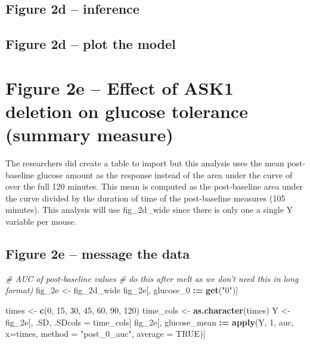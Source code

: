 \documentclass[]{book}
\newenvironment{Shaded}{\begin{snugshade}}{\end{snugshade}}
\newcommand{\CommentTok}[1]{\textcolor[rgb]{0.56,0.35,0.01}{\textit{#1}}}
\newcommand{\DataTypeTok}[1]{\textcolor[rgb]{0.13,0.29,0.53}{#1}}
\newcommand{\DecValTok}[1]{\textcolor[rgb]{0.00,0.00,0.81}{#1}}
\newcommand{\ErrorTok}[1]{\textcolor[rgb]{0.64,0.00,0.00}{\textbf{#1}}}
\newcommand{\KeywordTok}[1]{\textcolor[rgb]{0.13,0.29,0.53}{\textbf{#1}}}
\newcommand{\NormalTok}[1]{#1}
\newcommand{\OperatorTok}[1]{\textcolor[rgb]{0.81,0.36,0.00}{\textbf{#1}}}
\newcommand{\OtherTok}[1]{\textcolor[rgb]{0.56,0.35,0.01}{#1}}
\newcommand{\StringTok}[1]{\textcolor[rgb]{0.31,0.60,0.02}{#1}}
\begin{document}
\hypertarget{figure-2d-inference}{%
\subsection{Figure 2d -- inference}\label{figure-2d-inference}}

\hypertarget{figure-2d-plot-the-model}{%
\subsection{Figure 2d -- plot the model}\label{figure-2d-plot-the-model}}

\hypertarget{figure-2e-effect-of-ask1-deletion-on-glucose-tolerance-summary-measure}{%
\section{Figure 2e -- Effect of ASK1 deletion on glucose tolerance (summary measure)}\label{figure-2e-effect-of-ask1-deletion-on-glucose-tolerance-summary-measure}}

The researchers did create a table to import but this analysis uses the mean post-baseline glucose amount as the response instead of the area under the curve of over the full 120 minutes. This mean is computed as the post-baseline area under the curve divided by the duration of time of the post-baseline measures (105 minutes). This analysis will use fig\_2d\_wide since there is only one a single Y variable per mouse.

\hypertarget{figure-2e-message-the-data}{%
\subsection{Figure 2e -- message the data}\label{figure-2e-message-the-data}}

\begin{Shaded}
\begin{Highlighting}[]
\CommentTok{# AUC of post-baseline values}
\CommentTok{# do this after melt as we don't need this in long format)}
\NormalTok{fig_2e <-}\StringTok{ }\NormalTok{fig_2d_wide}
\NormalTok{fig_2e[, glucose_}\DecValTok{0} \OperatorTok{:}\ErrorTok{=}\StringTok{ }\KeywordTok{get}\NormalTok{(}\StringTok{"0"}\NormalTok{)]}

\NormalTok{times <-}\StringTok{ }\KeywordTok{c}\NormalTok{(}\DecValTok{0}\NormalTok{, }\DecValTok{15}\NormalTok{, }\DecValTok{30}\NormalTok{, }\DecValTok{45}\NormalTok{, }\DecValTok{60}\NormalTok{, }\DecValTok{90}\NormalTok{, }\DecValTok{120}\NormalTok{)}
\NormalTok{time_cols <-}\StringTok{ }\KeywordTok{as.character}\NormalTok{(times)}
\NormalTok{Y <-}\StringTok{ }\NormalTok{fig_2e[, .SD, .SDcols =}\StringTok{ }\NormalTok{time_cols]}
\NormalTok{fig_2e[, glucose_mean }\OperatorTok{:}\ErrorTok{=}\StringTok{ }\KeywordTok{apply}\NormalTok{(Y, }\DecValTok{1}\NormalTok{, auc,}
                           \DataTypeTok{x=}\NormalTok{times,}
                           \DataTypeTok{method =} \StringTok{"post_0_auc"}\NormalTok{,}
                           \DataTypeTok{average =} \OtherTok{TRUE}\NormalTok{)]}
\end{Highlighting}
\end{Shaded}
\end{document}
